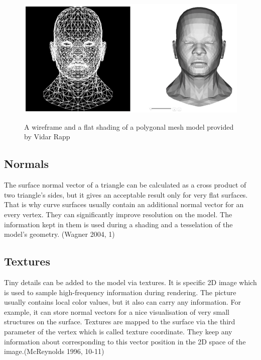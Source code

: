\documentclass[twoside, english, 11pt]{report}
\begin{document}
\begin{figure}[!h]
\includegraphics[scale=0.55]{img/mesh}\\
\caption{A wireframe and a flat shading of a polygonal mesh model provided by Vidar Rapp\label{fig:mesh}}
\end{figure}

\subsection{Normals}
The surface normal vector of a triangle can be calculated as a cross product of two triangle's sides, but it gives an acceptable result only for very flat surfaces. That is why curve surfaces usually contain an additional normal vector for an every vertex. They can significantly improve resolution on the model. The information kept in them is used during a shading and a tesselation of the model's geometry. (Wagner 2004, 1)\\


\subsection{Textures}
Tiny details can be added to the model via textures. It is specific 2D image which is used to sample high-frequency information during rendering. The picture usually contains local color values, but it also can carry any information. For example, it can store normal vectors for a nice visualisation of very small structures on the surface. Textures are mapped to the surface via the third parameter of the vertex which is called texture coordinate. They keep any information about corresponding to this vector position in the 2D space of the image.(McReynolds 1996, 10-11)\\
\end{document}
